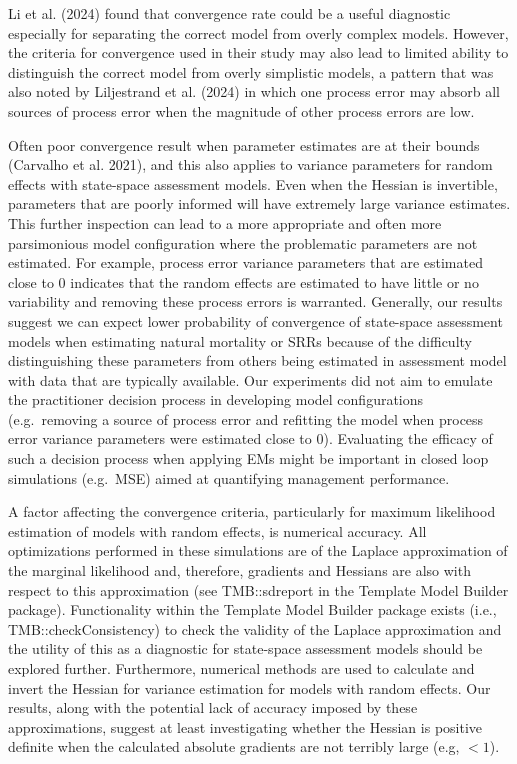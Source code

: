 \documentclass[
  12pt,
]{article}
\begin{document}
Li et al. (2024) found that convergence rate could be a useful
diagnostic especially for separating the correct model from overly
complex models. However, the criteria for convergence used in their
study may also lead to limited ability to distinguish the correct model
from overly simplistic models, a pattern that was also noted by
Liljestrand et al. (2024) in which one process error may absorb all
sources of process error when the magnitude of other process errors are
low.

Often poor convergence result when parameter estimates are at their
bounds (Carvalho et al. 2021), and this also applies to variance
parameters for random effects with state-space assessment models. Even
when the Hessian is invertible, parameters that are poorly informed will
have extremely large variance estimates. This further inspection can
lead to a more appropriate and often more parsimonious model
configuration where the problematic parameters are not estimated. For
example, process error variance parameters that are estimated close to 0
indicates that the random effects are estimated to have little or no
variability and removing these process errors is warranted. Generally,
our results suggest we can expect lower probability of convergence of
state-space assessment models when estimating natural mortality or SRRs
because of the difficulty distinguishing these parameters from others
being estimated in assessment model with data that are typically
available. Our experiments did not aim to emulate the practitioner
decision process in developing model configurations (e.g.~removing a
source of process error and refitting the model when process error
variance parameters were estimated close to 0). Evaluating the efficacy
of such a decision process when applying EMs might be important in
closed loop simulations (e.g.~MSE) aimed at quantifying management
performance.

A factor affecting the convergence criteria, particularly for maximum
likelihood estimation of models with random effects, is numerical
accuracy. All optimizations performed in these simulations are of the
Laplace approximation of the marginal likelihood and, therefore,
gradients and Hessians are also with respect to this approximation (see
TMB::sdreport in the Template Model Builder package). Functionality
within the Template Model Builder package exists (i.e.,
TMB::checkConsistency) to check the validity of the Laplace
approximation and the utility of this as a diagnostic for state-space
assessment models should be explored further. Furthermore, numerical
methods are used to calculate and invert the Hessian for variance
estimation for models with random effects. Our results, along with the
potential lack of accuracy imposed by these approximations, suggest at
least investigating whether the Hessian is positive definite when the
calculated absolute gradients are not terribly large (e.g, \(< 1\)).
\end{document}
